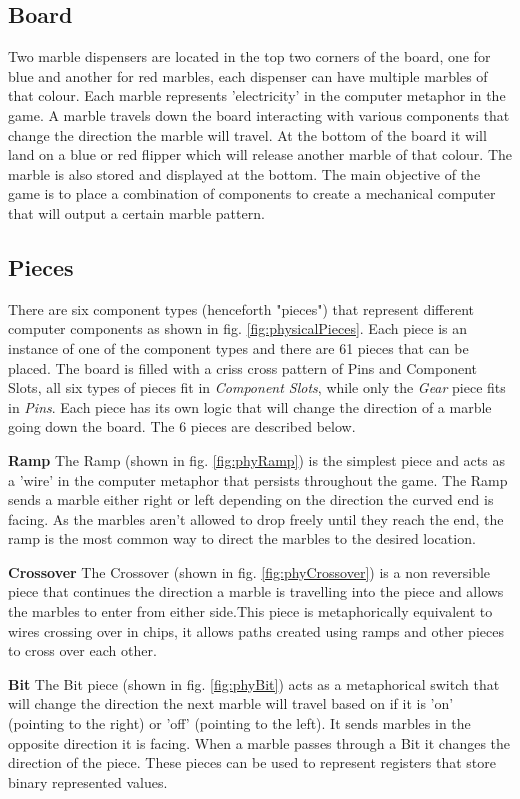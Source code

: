 \documentclass{l4proj}
\begin{document}
\subsection{Board}
Two marble dispensers are located in the top two corners of the board, one for blue and another for red marbles, each dispenser can have multiple marbles of that colour. Each marble represents 'electricity' in the computer metaphor in the game. A marble travels down the board interacting with various components that change the direction the marble will travel. At the bottom of the board it will land on a blue or red flipper which will release another marble of that colour. The marble is also stored and displayed at the bottom. The main objective of the game is to place a combination of components to create a mechanical computer that will output a certain marble pattern.



\subsection{Pieces}
There are six component types (henceforth "pieces") that represent different computer components as shown in fig. \ref{fig:physicalPieces}. Each piece is an instance of one of the component types and there are 61 pieces that can be placed. The board is filled with a criss cross pattern of Pins and Component Slots, all six types of pieces fit in \emph{Component Slots}, while only the \emph{Gear} piece fits in \emph{Pins}. Each piece has its own logic that will change the direction of a marble going down the board. The 6 pieces are described below.

\textbf{Ramp}
The Ramp (shown in fig. \ref{fig:phyRamp}) is the simplest piece and acts as a 'wire' in the computer metaphor that persists throughout the game. The Ramp sends a marble either right or left depending on the direction the curved end is facing. As the marbles aren't allowed to drop freely until they reach the end, the ramp is the most common way to direct the marbles to the desired location.

\textbf{Crossover}
The Crossover (shown in fig. \ref{fig:phyCrossover}) is a non reversible piece that continues the direction a marble is travelling into the piece and allows the marbles to enter from either side.This piece is metaphorically equivalent to wires crossing over in chips, it allows paths created using ramps and other pieces to cross over each other.

\textbf{Bit}
The Bit piece (shown in fig. \ref{fig:phyBit}) acts as a metaphorical switch that will change the direction the next marble will travel based on if it is 'on' (pointing to the right) or 'off' (pointing to the left). It sends marbles in the opposite direction it is facing. When a marble passes through a Bit it changes the direction of the piece. These pieces can be used to represent registers that store binary represented values.
\end{document}
